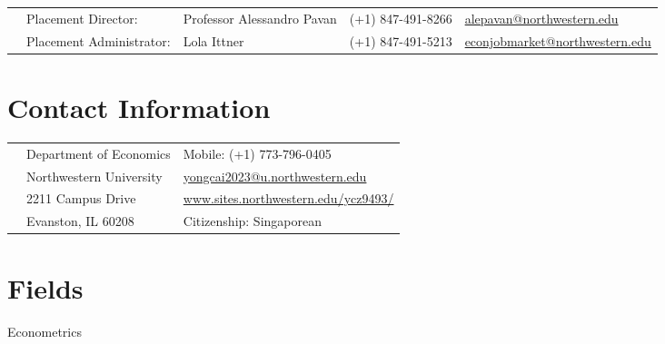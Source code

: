 \documentclass[margin,line]{res}
\newenvironment{list1}{
  \begin{list}{\ding{113}}{%
      \setlength{\itemsep}{.025in}
      \setlength{\parsep}{0in} \setlength{\parskip}{0in}
      \setlength{\topsep}{0in} \setlength{\partopsep}{0in}
      \setlength{\leftmargin}{0.17in}}}{\end{list}}
\begin{document}

~\\
~\\

\begin{resume}
\thispagestyle{plain} %

\begin{table}[h]
\footnotesize
\begin{tabular}{@{}p{0.20in}p{1.3in}p{1.4in}p{.9in}p{1.5in}}
& Placement Director:	& Professor Alessandro Pavan & (+1) 847-491-8266  & \href{mailto: alepavan@northwestern.edu}{alepavan@northwestern.edu}\\
& Placement Administrator:	& Lola Ittner &	(+1) 847-491-5213  & \href{mailto: econjobmarket@northwestern.edu}{econjobmarket@northwestern.edu}\\
 \end{tabular}
\end{table}
\vspace*{.05in}

\section{ Contact Information}
\vspace{.05in}
\begin{tabular}{@{}p{0.20in}p{2.5in}p{2.75in}}
 & Department of Economics           &Mobile: (+1) 773-796-0405 \\
 & Northwestern University   & \href{mailto: yongcai2023@u.northwestern.edu}{yongcai2023@u.northwestern.edu} \\
 & 2211 Campus Drive & \href{http://sites.northwestern.edu/ycz9493}{www.sites.northwestern.edu/ycz9493/}\\
 & Evanston, IL 60208  & Citizenship: Singaporean 
\end{tabular}
\vspace*{.05in}

\section{ Fields}
\begin{list1}
\item[] Econometrics
\end{list1}
\vspace*{.05in}


\end{resume}
\end{document}
